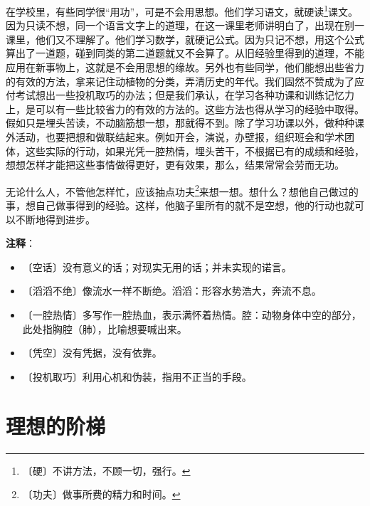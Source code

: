 \documentclass[12pt,UTF-8,openany]{ctexbook}
\begin{document}
\begin{large}
    在学校里，有些同学很“用功”，可是不会用思想。他们学习语文，就硬读\footnote{〔硬〕不讲方法，不顾一切，强行。}课文。因为只读不想，同一个语言文字上的道理，在这一课里老师讲明白了，出现在别一课里，他们又不理解了。他们学习数学，就硬记公式。因为只记不想，用这个公式算出了一道题，碰到同类的第二道题就又不会算了。从旧经验里得到的道理，不能应用在新事物上，这就是不会用思想的缘故。另外也有些同学，他们能想出些省力的有效的方法，拿来记住动植物的分类，弄清历史的年代。我们固然不赞成为了应付考试想出一些投机取巧的办法；但是我们承认，在学习各种功课和训练记忆力上，是可以有一些比较省力的有效的方法的。这些方法也得从学习的经验中取得。假如只是埋头苦读，不动脑筋想一想，那就得不到。除了学习功课以外，做种种课外活动，也要把想和做联结起来。例如开会，演说，办壁报，组织班会和学术团体，这些实际的行动，如果光凭一腔热情，埋头苦干，不根据已有的成绩和经验，想想怎样才能把这些事情做得更好，更有效果，那么，结果常常会劳而无功。
    
    无论什么人，不管他怎样忙，应该抽点功夫\footnote{〔功夫〕做事所费的精力和时间。}来想一想。想什么？想他自己做过的事，想自己做事得到的经验。这样，他脑子里所有的就不是空想，他的行动也就可以不断地得到进步。
    
\end{large}


\newpage

\textbf{注释}：

\vspace{-1em}

\begin{itemize}
    \setlength\itemsep{-0.2em}
    \item 〔空话〕没有意义的话；对现实无用的话；并未实现的诺言。
    \item 〔滔滔不绝〕像流水一样不断绝。滔滔：形容水势浩大，奔流不息。
    \item 〔一腔热情〕多写作一腔热血，表示满怀着热情。腔：动物身体中空的部分，此处指胸腔（肺），比喻想要喊出来。
    \item 〔凭空〕没有凭据，没有依靠。
    \item 〔投机取巧〕利用心机和伪装，指用不正当的手段。
\end{itemize}

\chapter{理想的阶梯}
\end{document}
